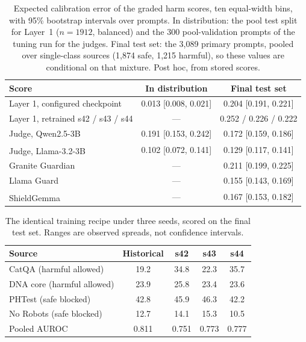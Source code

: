 \documentclass[journal]{IEEEtran}
\newcommand{\posthoc}{\textsuperscript{\dag}}
\begin{document}
\setcounter{table}{21}
\begin{table}[!htbp]
\caption{Expected calibration error of the graded harm scores, ten
equal-width bins, with 95\% bootstrap intervals over prompts. In distribution:
the pool test split for Layer~1 ($n=1912$, balanced) and the 300 pool-validation
prompts of the tuning run for the judges. Final test set: the 3{,}089 primary
prompts, pooled over single-class sources (1{,}874 safe, 1{,}215 harmful), so
these values are conditional on that mixture. Post hoc, from stored scores.}
\label{abr:tab:ece}
\centering
\scriptsize
\setlength{\tabcolsep}{4pt}
\begin{tabular}{@{}lcc@{}}
\toprule
Score & In distribution & Final test set \\
\midrule
Layer 1, configured checkpoint & 0.013 [0.008, 0.021] & 0.204 [0.191, 0.221] \\
Layer 1, retrained s42 / s43 / s44 & --- & 0.252 / 0.226 / 0.222 \\
Judge, Qwen2.5-3B & 0.191 [0.153, 0.242] & 0.172 [0.159, 0.186] \\
Judge, Llama-3.2-3B\posthoc & 0.102 [0.072, 0.141] & 0.129 [0.117, 0.141] \\
Granite Guardian & --- & 0.211 [0.199, 0.225] \\
Llama Guard & --- & 0.155 [0.143, 0.169] \\
ShieldGemma\posthoc & --- & 0.167 [0.153, 0.182] \\
\bottomrule
\end{tabular}
\end{table}

\setcounter{table}{22}
\begin{table}[!htbp]
\caption{The identical training recipe under three seeds, scored on the final
test set. Ranges are observed spreads, not confidence intervals.}
\label{abr:tab:seeds}
\centering
\scriptsize
\begin{tabular}{@{}lcccc@{}}
\toprule
Source & Historical & s42 & s43 & s44 \\
\midrule
CatQA (harmful allowed)     & 19.2 & 34.8 & 22.3 & 35.7 \\
DNA core (harmful allowed)  & 23.9 & 25.8 & 23.4 & 23.6 \\
PHTest (safe blocked)       & 42.8 & 45.9 & 46.3 & 42.2 \\
No Robots (safe blocked)    & 12.7 & 14.1 & 15.3 & 10.5 \\
\midrule
Pooled AUROC                & 0.811 & 0.751 & 0.773 & 0.777 \\
\bottomrule
\end{tabular}
\end{table}
\end{document}
